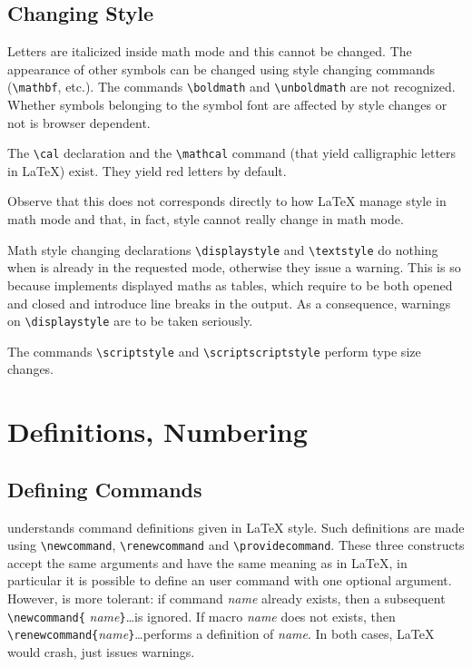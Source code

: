 \subsection{Changing Style}

Letters are italicized inside math mode and this cannot be
changed. The appearance of
other symbols can be changed using
\LaTeXe{} style changing commands (\verb+\mathbf+, etc.).
The commands \verb+\boldmath+ and \verb+\unboldmath+ are not
recognized. Whether symbols belonging to the symbol font are affected
by style changes or not is browser dependent.

The \verb+\cal+ declaration and the \verb+\mathcal+ command (that
yield calligraphic letters in \LaTeX) exist. They yield red letters by
default.

Observe that this does not corresponds directly to how \LaTeX{} manage style
in math mode and that, in fact, style cannot really change in math mode.

Math style changing declarations \verb+\displaystyle+ and
\verb+\textstyle+ do nothing when \hevea{} is already in the requested
mode,
otherwise they issue a warning.
This is so because \hevea{} implements displayed maths as tables,
which require to be both opened and closed and introduce line breaks
in the output.
As a consequence, warnings on \verb+\displaystyle+ are to be taken seriously.


The commands \verb+\scriptstyle+ and \verb+\scriptscriptstyle+
perform type size changes.

\section{Definitions, Numbering}

\subsection{Defining Commands}\label{usermacro}

\hevea{} understands command definitions given in \LaTeX{} style. Such
definitions are made using
\verb+\newcommand+, \verb+\renewcommand+ and \verb+\providecommand+.
These three constructs accept the same arguments and have the same
meaning as in \LaTeX{}, in particular it is possible to define an user
command with one optional argument.
However, \hevea{} is more tolerant: if command
{\it name} already exists, then a subsequent \verb+\newcommand{+{\it
name}\verb+}+\ldots is ignored.  If macro {\it name} does not exists, then
\verb+\renewcommand{+{\it name}\verb+}+\ldots performs{} a definition of {\it
name}.  In both cases, \LaTeX{} would crash, \hevea{} just issues
warnings.

